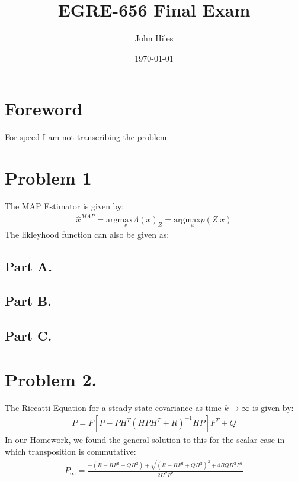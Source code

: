\documentclass{article}
\title{EGRE-656 Final Exam}
\author{John Hiles}
\date\today
\begin{document}
\maketitle %

\section*{Foreword}
For speed I am not transcribing the problem.

\section*{Problem 1}
The MAP Estimator is given by:
\begin{align*}
\hat{x}^{MAP} = \text{arg} \underset{x}{\text{max}}\Lambda(x)_Z = \text{arg} \underset{x}{\text{max}}p(Z|x)
\end{align*}
The likleyhood function can also be given as:


\subsection*{Part A.}

\subsection*{Part B.}

\subsection*{Part C.}

\clearpage
\section*{Problem 2.}
The Riccatti Equation for a steady state covariance as time $k\rightarrow \infty$ is given by:
\begin{align*}
P = F[P-P H^T (HPH^T + R)^{-1} HP] F^T + Q
\end{align*}
In our Homework, we found the general solution to this for the scalar case in which transposition is commutative:
\begin{align*}
P_{\infty} = \frac{-(R-RF^2+Q H^2) + \sqrt{(R-RF^2 + QH^2)^2+4RQH^2F^2}}{2H^2 F^2}
\end{align*}
\end{document}
